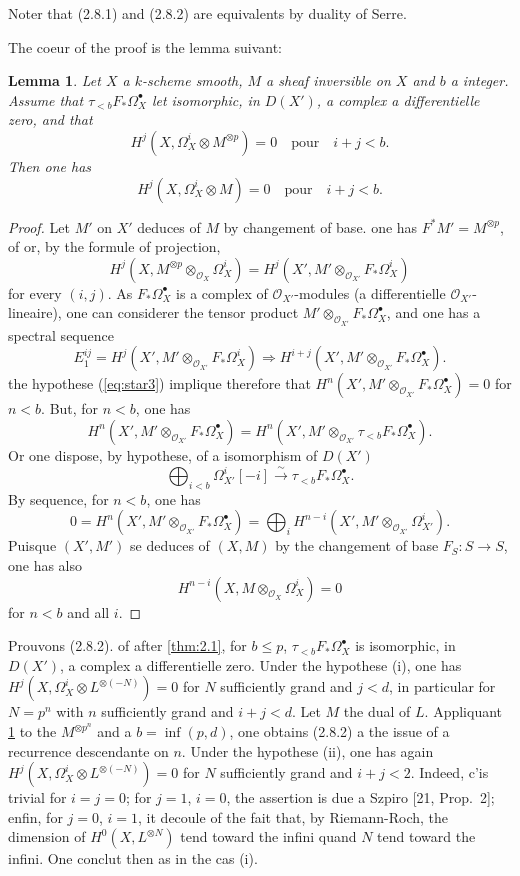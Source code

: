 \documentclass[12pt,a4paper]{article}
\theoremstyle{plain}
\newtheorem{lemma}[theorem]{Lemma}
\theoremstyle{definition}
\theoremstyle{remark}
\newcommand{\cO}{\mathcal{O}}
\begin{document}
Noter that (2.8.1) and (2.8.2) are equivalents by duality of Serre.

The coeur of the proof is the lemma suivant:

\begin{lemma}\label{lem:2.9}
Let $X$ a $k$-scheme smooth, $M$ a sheaf inversible on $X$ and $b$ a integer. Assume that $\tau_{<b} F_* \Omega^{\bullet}_X$ let isomorphic, in $D(X')$, a complex a differentielle zero, and that
\begin{equation}\label{eq:star3}
H^j(X, \Omega^i_X \otimes M^{\otimes p}) = 0 \quad \text{pour} \quad i + j < b.
\end{equation}
Then one has
\[
H^j(X, \Omega^i_X \otimes M) = 0 \quad \text{pour} \quad i + j < b.
\]
\end{lemma}

\begin{proof}
Let $M'$ on $X'$ deduces of $M$ by changement of base. one has $F^* M' = M^{\otimes p}$, of or, by the formule of projection,
\[
H^j(X, M^{\otimes p} \otimes_{\cO_X} \Omega^i_X) = H^j(X', M' \otimes_{\cO_{X'}} F_* \Omega^i_X)
\]
for every $(i, j)$. As $F_* \Omega^{\bullet}_X$ is a complex of $\cO_{X'}$-modules (a differentielle $\cO_{X'}$-lineaire), one can considerer the tensor product $M' \otimes_{\cO_{X'}} F_* \Omega^{\bullet}_X$, and one has a spectral sequence
\[
E_1^{ij} = H^j(X', M' \otimes_{\cO_{X'}} F_* \Omega^i_X) \Rightarrow H^{i+j}(X', M' \otimes_{\cO_{X'}} F_* \Omega^{\bullet}_X).
\]
the hypothese (\ref{eq:star3}) implique therefore that $H^n(X', M' \otimes_{\cO_{X'}} F_* \Omega^{\bullet}_X) = 0$ for $n < b$. But, for $n < b$, one has
\[
H^n(X', M' \otimes_{\cO_{X'}} F_* \Omega^{\bullet}_X) = H^n(X', M' \otimes_{\cO_{X'}} \tau_{<b} F_* \Omega^{\bullet}_X).
\]
Or one dispose, by hypothese, of a isomorphism of $D(X')$
\[
\bigoplus_{i < b} \Omega^i_{X'}[-i] \xrightarrow{\sim} \tau_{<b} F_* \Omega^{\bullet}_X.
\]
By sequence, for $n < b$, one has
\[
0 = H^n(X', M' \otimes_{\cO_{X'}} F_* \Omega^{\bullet}_X) = \bigoplus_i H^{n-i}(X', M' \otimes_{\cO_{X'}} \Omega^i_{X'}).
\]
Puisque $(X', M')$ se deduces of $(X, M)$ by the changement of base $F_S: S \to S$, one has also
\[
H^{n-i}(X, M \otimes_{\cO_X} \Omega^i_X) = 0
\]
for $n < b$ and all $i$.
\end{proof}

Prouvons (2.8.2). of after \ref{thm:2.1}, for $b \le p$, $\tau_{<b} F_* \Omega^{\bullet}_X$ is isomorphic, in $D(X')$, a complex a differentielle zero. Under the hypothese (i), one has $H^j(X, \Omega^i_X \otimes L^{\otimes(-N)}) = 0$ for $N$ sufficiently grand and $j < d$, in particular for $N = p^n$ with $n$ sufficiently grand and $i + j < d$. Let $M$ the dual of $L$. Appliquant \ref{lem:2.9} to the $M^{\otimes p^n}$ and a $b = \inf(p, d)$, one obtains (2.8.2) a the issue of a recurrence descendante on $n$. Under the hypothese (ii), one has again $H^j(X, \Omega^i_X \otimes L^{\otimes(-N)}) = 0$ for $N$ sufficiently grand and $i + j < 2$. Indeed, c'is trivial for $i = j = 0$; for $j = 1$, $i = 0$, the assertion is due a Szpiro [21, Prop.~2]; enfin, for $j = 0$, $i = 1$, it decoule of the fait that, by Riemann-Roch, the dimension of $H^0(X, L^{\otimes N})$ tend toward the infini quand $N$ tend toward the infini. One conclut then as in the cas (i).
\end{document}
